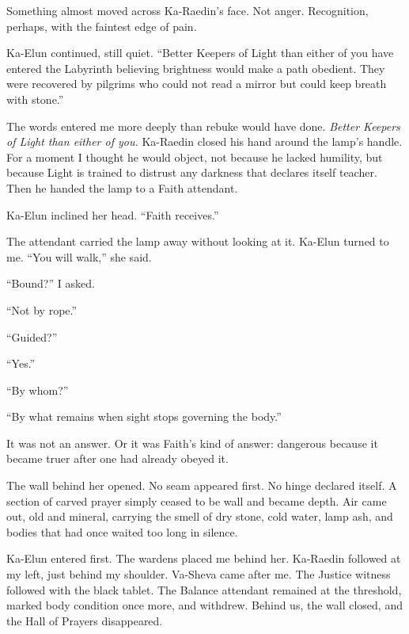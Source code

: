 Something almost moved across Ka-Raedin's face. Not anger. Recognition, perhaps, with the faintest edge of pain.\par

Ka-Elun continued, still quiet. ``Better Keepers of Light than either of you have entered the Labyrinth believing brightness would make a path obedient. They were recovered by pilgrims who could not read a mirror but could keep breath with stone.''\par

The words entered me more deeply than rebuke would have done. \emph{Better Keepers of Light than either of you.} Ka-Raedin closed his hand around the lamp's handle. For a moment I thought he would object, not because he lacked humility, but because Light is trained to distrust any darkness that declares itself teacher. Then he handed the lamp to a Faith attendant.\par

Ka-Elun inclined her head. ``Faith receives.''\par

The attendant carried the lamp away without looking at it. Ka-Elun turned to me. ``You will walk,'' she said.\par

``Bound?'' I asked.\par

``Not by rope.''\par

``Guided?''\par

``Yes.''\par

``By whom?''\par

``By what remains when sight stops governing the body.''\par

It was not an answer. Or it was Faith's kind of answer: dangerous because it became truer after one had already obeyed it.\par

The wall behind her opened. No seam appeared first. No hinge declared itself. A section of carved prayer simply ceased to be wall and became depth. Air came out, old and mineral, carrying the smell of dry stone, cold water, lamp ash, and bodies that had once waited too long in silence.\par

Ka-Elun entered first. The wardens placed me behind her. Ka-Raedin followed at my left, just behind my shoulder. Va-Sheva came after me. The Justice witness followed with the black tablet. The Balance attendant remained at the threshold, marked body condition once more, and withdrew. Behind us, the wall closed, and the Hall of Prayers disappeared.\par

